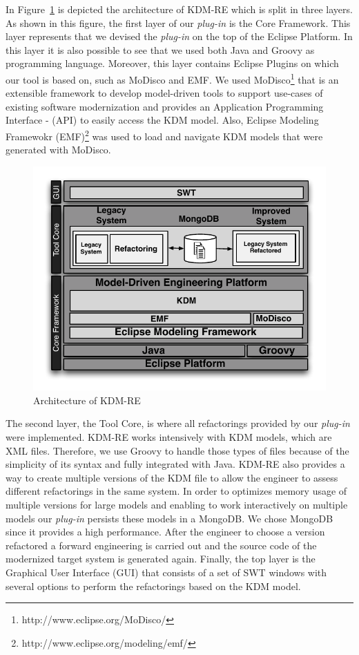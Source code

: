 In Figure~\ref{fig:architecture} is depicted the architecture of KDM-RE which is split in three layers. As shown in this figure, the first layer of our \textit{plug-in} is the Core Framework. This layer represents that  we devised the  \textit{plug-in} on the top of the Eclipse Platform. In this layer it is also possible to see that we  used both Java and Groovy as programming language. Moreover, this layer contains Eclipse Plugins on which our tool is based on, such as MoDisco and EMF. We used MoDisco\footnote{http://www.eclipse.org/MoDisco/} that is an extensible framework to develop model-driven tools to support use-cases of existing software modernization and provides an Application Programming Interface - (API) to easily access the KDM model. Also, Eclipse Modeling Framewokr (EMF)\footnote{http://www.eclipse.org/modeling/emf/} was used to load and navigate KDM models that were generated with MoDisco. 

\begin{figure}[!ht]
\centering
  \includegraphics[scale=0.8]{figure/Arquitetura}
\caption{Architecture of KDM-RE}
\label{fig:architecture}
\end{figure}  

The second layer, the Tool Core, is where all refactorings provided by our \textit{plug-in} were implemented. KDM-RE works intensively with KDM models, which are XML files. Therefore, we use Groovy to handle those types of files because of the simplicity of its syntax and fully integrated with Java. KDM-RE also provides a way to create multiple versions of the KDM file to allow the engineer  to assess different refactorings in the same system. In order to optimizes memory usage of multiple versions for large models and enabling to work interactively on multiple models our \textit{plug-in} persists these models in a MongoDB. We chose MongoDB since it provides a high performance. After the engineer to choose a version refactored a forward engineering is carried out and the source code of the modernized target system is generated again. Finally, the top layer is the Graphical User Interface (GUI) that consists of a set of SWT windows with several options to perform the refactorings based on the KDM model.


